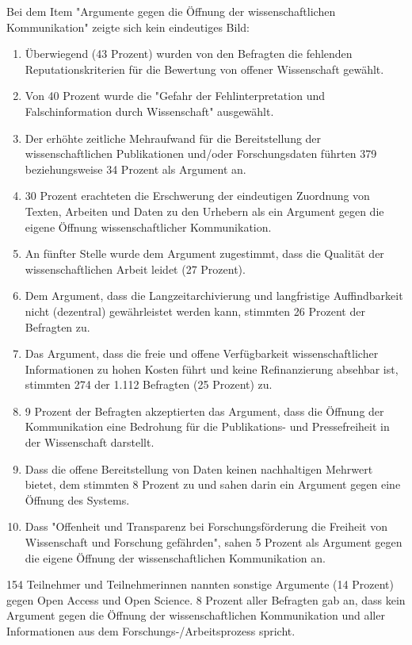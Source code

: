 Bei dem Item "Argumente gegen die Öffnung der wissenschaftlichen Kommunikation" zeigte sich kein eindeutiges Bild:
\begin{enumerate}
\item Überwiegend (43 Prozent) wurden von den Befragten die fehlenden Reputationskriterien für die Bewertung von offener Wissenschaft gewählt.
\item Von 40 Prozent wurde die "Gefahr der Fehlinterpretation und Falschinformation durch Wissenschaft" ausgewählt.
\item Der erhöhte zeitliche Mehraufwand für die Bereitstellung der wissenschaftlichen Publikationen und/oder Forschungsdaten führten 379 beziehungsweise 34 Prozent als Argument an.
\item 30 Prozent erachteten die Erschwerung der eindeutigen Zuordnung von Texten, Arbeiten und Daten zu den Urhebern als ein Argument gegen die eigene Öffnung wissenschaftlicher Kommunikation.
\item An fünfter Stelle wurde dem Argument zugestimmt, dass die Qualität der wissenschaftlichen Arbeit leidet (27 Prozent).
\item Dem Argument, dass die Langzeitarchivierung und langfristige Auffindbarkeit nicht (dezentral) gewährleistet werden kann, stimmten 26 Prozent der Befragten zu.
\item Das Argument, dass die freie und offene Verfügbarkeit wissenschaftlicher Informationen zu hohen Kosten führt und keine Refinanzierung absehbar ist, stimmten 274 der 1.112 Befragten (25 Prozent) zu.
\item 9 Prozent der Befragten akzeptierten das Argument, dass die Öffnung der Kommunikation eine Bedrohung für die Publikations- und Pressefreiheit in der Wissenschaft darstellt.
\item Dass die offene Bereitstellung von Daten keinen nachhaltigen Mehrwert bietet, dem stimmten 8 Prozent zu und sahen darin ein Argument gegen eine Öffnung des Systems.
\item Dass "Offenheit und Transparenz bei Forschungsförderung die Freiheit von Wissenschaft und Forschung gefährden", sahen 5 Prozent als Argument gegen die eigene Öffnung der wissenschaftlichen Kommunikation an.
\end{enumerate}

154 Teilnehmer und Teilnehmerinnen nannten sonstige Argumente (14 Prozent) gegen Open Access und Open Science. 8 Prozent aller Befragten gab an, dass kein Argument gegen die Öffnung der wissenschaftlichen Kommunikation und aller Informationen aus dem Forschungs-/Arbeitsprozess spricht.


